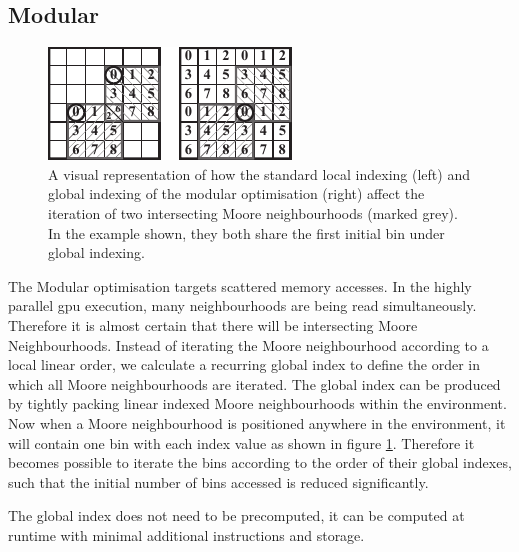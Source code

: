     

  \subsection{Modular}
\begin{figure}[!t]
\centering
\includegraphics[width=\linewidth]{../resources/modular/modular.pdf}
\caption{\label{fig:modular}A visual representation of how the standard local indexing (left) and global indexing of the modular optimisation (right) affect the iteration of two intersecting Moore neighbourhoods (marked grey). In the example shown, they both share the first initial bin under global indexing.}
\end{figure}
    The Modular optimisation targets scattered memory accesses. In the highly parallel \gls{gpu} execution, many neighbourhoods are being read simultaneously. Therefore it is almost certain that there will be intersecting Moore Neighbourhoods. Instead of iterating the Moore neighbourhood according to a local linear order, we calculate a recurring global index to define the order in which all Moore neighbourhoods are iterated. The global index can be produced by tightly packing linear indexed Moore neighbourhoods within the environment. Now when a Moore neighbourhood is positioned anywhere in the environment, it will contain one bin with each index value as shown in figure \ref{fig:modular}. Therefore it becomes possible to iterate the bins according to the order of their global indexes, such that the initial number of bins accessed is reduced significantly.
    
    The global index does not need to be precomputed, it can be computed at runtime with minimal additional instructions and storage.
    
